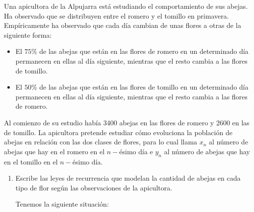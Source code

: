 \begin{ejercicio}
    Una apicultora de la Alpujarra está estudiando el comportamiento de sus abejas. Ha observado que se distribuyen entre el romero y el tomillo en primavera. Empíricamente ha observado que cada día cambian de unas flores a otras de la siguiente forma:
    \begin{itemize}
        \item El $75\%$ de las abejas que están en las flores de romero en un determinado día permanecen en ellas al día siguiente, mientras que el resto cambia a las flores de tomillo.

        \item El $50\%$ de las abejas que están en las flores de tomillo en un determinado día permanecen en ellas al día siguiente, mientras que el resto cambia a las flores de romero.
    \end{itemize}

    Al comienzo de su estudio había 3400 abejas en las flores de romero y 2600 en las de tomillo. La apicultora pretende estudiar cómo evoluciona la población de abejas en relación con las dos clases de flores, para lo cual llama $x_n$ al número de abejas que hay en el romero en el $n-$ésimo día e $y_n$ al número de abejas que hay en el tomillo en el $n-$ésimo día.

    \begin{enumerate}
        \item Escribe las leyes de recurrencia que modelan la cantidad de abejas en cada tipo de flor según las observaciones de la apicultora.

        Tenemos la siguiente situación:
        \begin{figure}[H]
            \centering
        \end{figure}


\end{enumerate}
\end{ejercicio}

